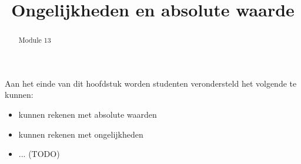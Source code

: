 \documentclass{ximera}
\title{Ongelijkheden en absolute waarde}
\begin{document}
\begin{abstract}
Module 13
\end{abstract}

\maketitle

\begin{sectionOutcomes}

Aan het einde van dit hoofdstuk worden studenten verondersteld het volgende te kunnen:

\begin{itemize}
\item kunnen rekenen met absolute waarden
\item kunnen rekenen met ongelijkheden 
\item ... (TODO)
\end{itemize}

\end{sectionOutcomes}
\end{document}

